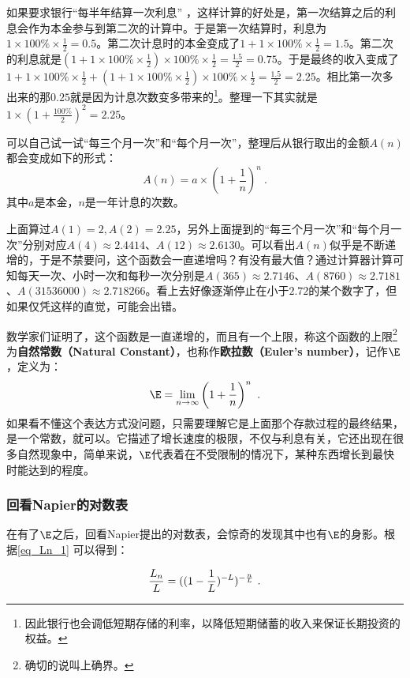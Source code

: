 如果要求银行“每半年结算一次利息” ，这样计算的好处是，第一次结算之后的利息会作为本金参与到第二次的计算中。于是第一次结算时，利息为$\displaystyle1\times100\%\times\frac{1}{2}=0.5$。第二次计息时的本金变成了$\displaystyle1+1\times100\%\times\frac{1}{2}=1.5$。第二次的利息就是$\displaystyle(1+1\times100\%\times\frac{1}{2})\times100\%\times\frac{1}{2}=\frac{1.5}{2}=0.75$。于是最终的收入变成了$\displaystyle1+1\times100\%\times\frac{1}{2}+(1+1\times100\%\times\frac{1}{2})\times100\%\times\frac{1}{2}=\frac{1.5}{2}=2.25$。相比第一次多出来的那$0.25$就是因为计息次数变多带来的\footnote{因此银行也会调低短期存储的利率，以降低短期储蓄的收入来保证长期投资的权益。}。整理一下其实就是$1\times(1+\frac{100\%}{2})^2=2.25$。

可以自己试一试“每三个月一次”和“每个月一次”，整理后从银行取出的金额$A(n)$都会变成如下的形式：
\begin{equation}
A(n)=a\times\left(1+\frac{1}{n}\right)^n~.
\end{equation}
其中$a$是本金，$n$是一年计息的次数。

上面算过$A(1)=2,A(2)=2.25$，另外上面提到的“每三个月一次”和“每个月一次”分别对应$A(4)\approx 2.4414$、$A(12)\approx 2.6130$。可以看出$A(n)$似乎是不断递增的，于是不禁要问，这个函数会一直递增吗？有没有最大值？通过计算器计算可知每天一次、小时一次和每秒一次分别是$A(365)\approx 2.7146$、$A(8760)\approx2.7181$、$A(31536000)\approx 2.718266$。看上去好像逐渐停止在小于$2.72$的某个数字了，但如果仅凭这样的直觉，可能会出错。

数学家们证明了，这个函数是一直递增的，而且有一个上限，称这个函数的上限\footnote{确切的说叫上确界。}为\textbf{自然常数（Natural Constant）}，也称作\textbf{欧拉数（Euler's number）}，记作$\E$，定义为：
\begin{equation}
\E = \lim_{n \to \infty} \left( 1 + \frac{1}{n} \right)^n~.
\end{equation}
如果看不懂这个表达方式没问题，只需要理解它是上面那个存款过程的最终结果，是一个常数，就可以。它描述了增长速度的极限，不仅与利息有关，它还出现在很多自然现象中，简单来说，$\E$代表着在不受限制的情况下，某种东西增长到最快时能达到的程度。

\subsubsection{回看Napier的对数表}

在有了$\E$之后，回看Napier提出的对数表，会惊奇的发现其中也有$\E$的身影。根据\autoref{eq_Ln_1} 可以得到：

\begin{equation}
{L_n\over L}=((1-{1\over L})^{-L})^{-{n\over L}}~.
\end{equation}

